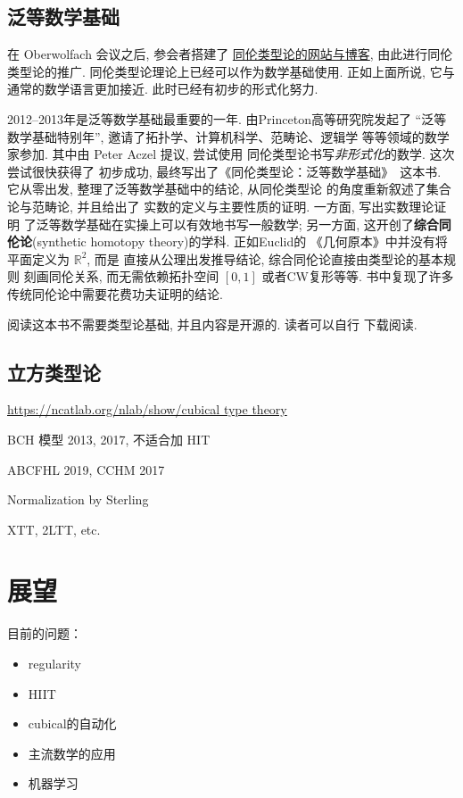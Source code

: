 \documentclass[UTF8]{ctexbook}
\theoremstyle{plain}
\theoremstyle{definition}
\theoremstyle{remark}
\begin{document}
\section{泛等数学基础}
在 Oberwolfach 会议之后, 参会者搭建了%
\href{http://homotopytypetheory.org/}{同伦类型论的网站与博客},
由此进行同伦类型论的推广.
同伦类型论理论上已经可以作为数学基础使用. 正如上面所说, 它与
通常的数学语言更加接近. 此时已经有初步的形式化努力.

2012--2013年是泛等数学基础最重要的一年. 由Princeton高等研究院发起了
“泛等数学基础特别年”, 邀请了拓扑学、计算机科学、范畴论、逻辑学
等等领域的数学家参加. 其中由 Peter Aczel 提议, 尝试使用
同伦类型论书写\emph{非形式化}的数学. 这次尝试很快获得了
初步成功, 最终写出了《同伦类型论：泛等数学基础》~\cite{ufp:2013:hottbook}这本书.
它从零出发, 整理了泛等数学基础中的结论, 从同伦类型论
的角度重新叙述了集合论与范畴论, 并且给出了
实数的定义与主要性质的证明. 一方面, 写出实数理论证明
了泛等数学基础在实操上可以有效地书写一般数学; 另一方面,
这开创了\textbf{综合同伦论}(synthetic homotopy theory)的学科. 正如Euclid的
《几何原本》中并没有将平面定义为 \(\mathbb R^2\), 而是
直接从公理出发推导结论, 综合同伦论直接由类型论的基本规则
刻画同伦关系, 而无需依赖拓扑空间 \([0,1]\) 或者CW复形等等.
书中复现了许多传统同伦论中需要花费功夫证明的结论.

阅读这本书不需要类型论基础, 并且内容是开源的. 读者可以自行
下载阅读.

\section{立方类型论}


\url{https://ncatlab.org/nlab/show/cubical type theory}

BCH 模型 2013, 2017, 不适合加 HIT

ABCFHL 2019, CCHM 2017

Normalization by Sterling

XTT, 2LTT, etc.

\chapter{展望}
目前的问题：
\begin{itemize}
\item regularity
\item HIIT
\item cubical的自动化
\item 主流数学的应用
\item 机器学习
\end{itemize}

\printbibliography[title=参考文献]
\end{document}
